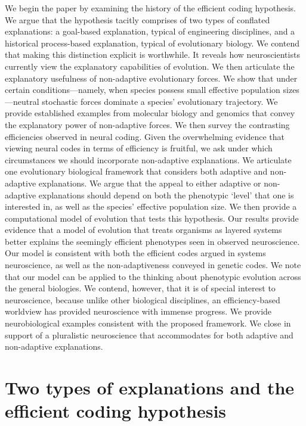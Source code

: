 \documentclass[twocolumn]{article}
\begin{document}
We begin the paper by examining the history of the efficient coding hypothesis. We argue that the hypothesis tacitly comprises of two types of conflated explanations: a goal-based explanation, typical of engineering disciplines, and a historical process-based explanation, typical of evolutionary biology. We contend that making this distinction explicit is worthwhile. It reveals how neuroscientists currently view the explanatory capabilities of evolution. We then articulate the explanatory usefulness of non-adaptive evolutionary forces. We show that under certain conditions---namely, when species possess small effective population sizes---neutral stochastic forces dominate a species' evolutionary trajectory. We provide established examples from molecular biology and genomics that convey the explanatory power of non-adaptive forces. We then survey the contrasting efficiencies observed in neural coding. Given the overwhelming evidence that viewing neural codes in terms of efficiency is fruitful, we ask under which circumstances we should incorporate non-adaptive explanations. We articulate one evolutionary biological framework that considers both adaptive and non-adaptive explanations. We argue that the appeal to either adaptive or non-adaptive explanations should depend on both the phenotypic `level' that one is interested in, as well as the species' effective population size. We then provide a computational model of evolution that tests this hypothesis. Our results provide evidence that a model of evolution that treats organisms as layered systems better explains the seemingly efficient phenotypes seen in observed neuroscience. Our model is consistent with both the efficient codes argued in systems neuroscience, as well as the non-adaptiveness conveyed in genetic codes. We note that our model can be applied to the thinking about phenotypic evolution across the general biologies. We contend, however, that it is of special interest to neuroscience, because unlike other biological disciplines, an efficiency-based worldview has provided neuroscience with immense progress. We provide neurobiological examples consistent with the proposed framework. We close in support of a pluralistic neuroscience that accommodates for both adaptive and non-adaptive explanations. 

\section{Two types of explanations and the efficient coding hypothesis}
\end{document}
